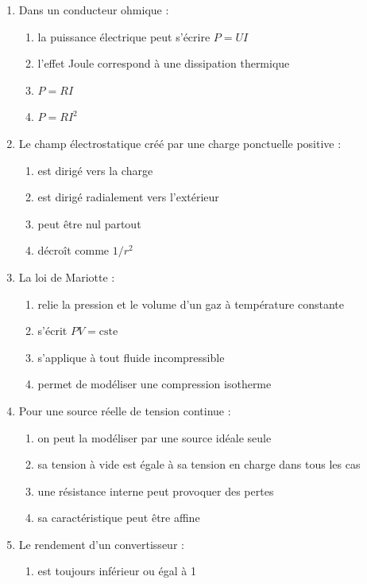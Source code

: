 \documentclass[11pt,a4paper]{article}
\begin{document}
\begin{enumerate}[label=\textbf{QCM \arabic*.},leftmargin=*]
\begin{enumerate}[label=\alph*)]
\item elle peut diminuer sous l'effet des frottements
\item elle est une force
\end{enumerate}
\item Dans un conducteur ohmique :
\begin{enumerate}[label=\alph*)]
\item la puissance électrique peut s'écrire $P=UI$
\item l'effet Joule correspond à une dissipation thermique
\item $P=RI$
\item $P=RI^2$
\end{enumerate}
\item Le champ électrostatique créé par une charge ponctuelle positive :
\begin{enumerate}[label=\alph*)]
\item est dirigé vers la charge
\item est dirigé radialement vers l'extérieur
\item peut être nul partout
\item décroît comme $1/r^2$
\end{enumerate}
\item La loi de Mariotte :
\begin{enumerate}[label=\alph*)]
\item relie la pression et le volume d'un gaz à température constante
\item s'écrit $PV=\mathrm{cste}$
\item s'applique à tout fluide incompressible
\item permet de modéliser une compression isotherme
\end{enumerate}
\item Pour une source réelle de tension continue :
\begin{enumerate}[label=\alph*)]
\item on peut la modéliser par une source idéale seule
\item sa tension à vide est égale à sa tension en charge dans tous les cas
\item une résistance interne peut provoquer des pertes
\item sa caractéristique peut être affine
\end{enumerate}
\item Le rendement d'un convertisseur :
\begin{enumerate}[label=\alph*)]
\item est toujours inférieur ou égal à 1

\end{enumerate}
\end{enumerate}
\end{document}
